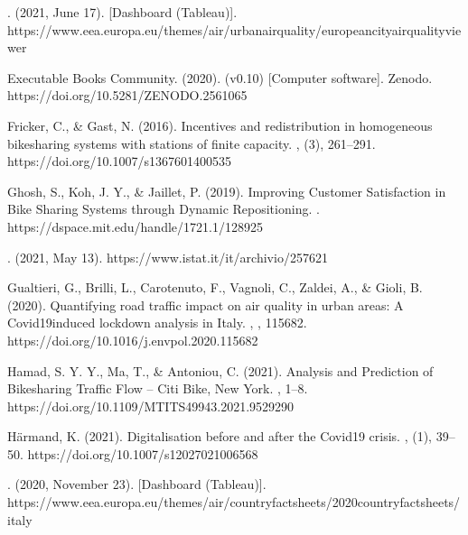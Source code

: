 \documentclass[letterpaper,10pt,english]{jupyterBook}
\begin{document}
\sphinxAtStartPar
{}. (2021, June 17). {[}Dashboard (Tableau){]}. https://www.eea.europa.eu/themes/air/urban\sphinxhyphen{}air\sphinxhyphen{}quality/european\sphinxhyphen{}city\sphinxhyphen{}air\sphinxhyphen{}quality\sphinxhyphen{}viewer

\sphinxAtStartPar
Executable Books Community. (2020).  (v0.10) {[}Computer software{]}. Zenodo. https://doi.org/10.5281/ZENODO.2561065

\sphinxAtStartPar
Fricker, C., \& Gast, N. (2016). Incentives and redistribution in homogeneous bike\sphinxhyphen{}sharing systems with stations of finite capacity. , (3), 261–291. https://doi.org/10.1007/s13676\sphinxhyphen{}014\sphinxhyphen{}0053\sphinxhyphen{}5

\sphinxAtStartPar
Ghosh, S., Koh, J. Y., \& Jaillet, P. (2019). Improving Customer Satisfaction in Bike Sharing Systems through Dynamic Repositioning. . https://dspace.mit.edu/handle/1721.1/128925

\sphinxAtStartPar
{}. (2021, May 13). https://www.istat.it/it/archivio/257621

\sphinxAtStartPar
Gualtieri, G., Brilli, L., Carotenuto, F., Vagnoli, C., Zaldei, A., \& Gioli, B. (2020). Quantifying road traffic impact on air quality in urban areas: A Covid19\sphinxhyphen{}induced lockdown analysis in Italy. , , 115682. https://doi.org/10.1016/j.envpol.2020.115682

\sphinxAtStartPar
Hamad, S. Y. Y., Ma, T., \& Antoniou, C. (2021). Analysis and Prediction of Bikesharing Traffic Flow – Citi Bike, New York. , 1–8. https://doi.org/10.1109/MT\sphinxhyphen{}ITS49943.2021.9529290

\sphinxAtStartPar
Härmand, K. (2021). Digitalisation before and after the Covid\sphinxhyphen{}19 crisis. , (1), 39–50. https://doi.org/10.1007/s12027\sphinxhyphen{}021\sphinxhyphen{}00656\sphinxhyphen{}8

\sphinxAtStartPar
{}. (2020, November 23). {[}Dashboard (Tableau){]}. https://www.eea.europa.eu/themes/air/country\sphinxhyphen{}fact\sphinxhyphen{}sheets/2020\sphinxhyphen{}country\sphinxhyphen{}fact\sphinxhyphen{}sheets/italy
\end{document}
